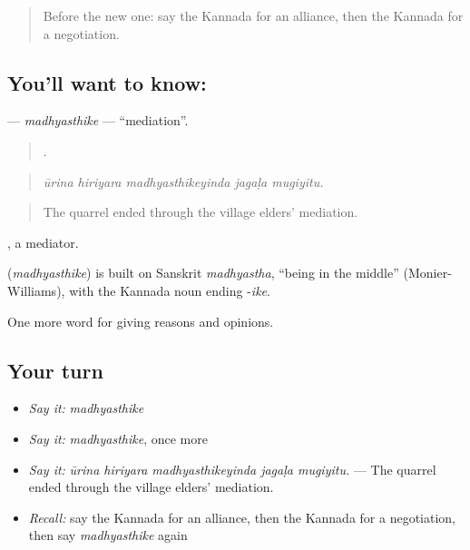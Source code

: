 \label{lesson:KA-C405-madhyasthike}



\begin{quote}
Before the new one: say the Kannada for an alliance, then the Kannada for a negotiation.
\end{quote}

\subsection*{You'll want to know: }
\textbf{} — \emph{madhyasthike} — \textquotedblleft{}mediation\textquotedblright{}.

\begin{quote}
    .
\end{quote}

\begin{quote}
\emph{ūrina hiriyara madhyasthikeyinda jagaḷa mugiyitu.}
\end{quote}

\begin{quote}
The quarrel ended through the village elders' mediation.
\end{quote}

, a mediator.

\begin{cousinweb}
\textbf{} (\emph{madhyasthike}) is built on Sanskrit \emph{madhyastha}, \textquotedblleft{}being in the middle\textquotedblright{} (Monier-Williams), with the Kannada noun ending -\emph{ike}.
\end{cousinweb}

\begin{grammarlens}[title={What you've built}]
One more word for giving reasons and opinions.
\end{grammarlens}

\subsection*{Your turn}
\begin{itemize}
\raggedright
  \item \emph{Say it:} \emph{madhyasthike}
  \item \emph{Say it:} \emph{madhyasthike}, once more
  \item \emph{Say it:} \emph{ūrina hiriyara madhyasthikeyinda jagaḷa mugiyitu.} — The quarrel ended through the village elders' mediation.
  \item \emph{Recall:} say the Kannada for an alliance, then the Kannada for a negotiation, then say \emph{madhyasthike} again
\end{itemize}

